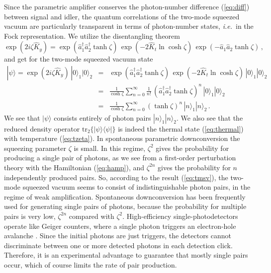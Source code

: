 \documentclass[12pt,amsmath,amssymb]{article}
\numberwithin{equation}{section}
\begin{document}
Since the parametric amplifier conserves the photon-number
difference (\ref{eq:diff}) between signal and idler,
the quantum correlations of the two-mode squeezed vacuum
are particularly transparent in terms of photon-number states,
{\it i.e.}\ in the Fock representation.
We utilize the disentangling theorem \cite{Gilles,Perelomov}
\begin{equation}
\exp(2i\zeta\hat{K}_y) =
\exp(\hat{a}_1^\dagger\hat{a}_2^\dagger\tanh\zeta)\,
\exp(-2\hat{K}_t\ln\cosh\zeta)\,
\exp(-\hat{a}_1\hat{a}_2\tanh\zeta)\,,
\end{equation}
and get for the two-mode squeezed vacuum state
\begin{eqnarray}
|\psi\rangle =
\exp(2i\zeta\hat{K}_y)\, |0\rangle_1 |0\rangle_2
&=&
\exp(\hat{a}_1^\dagger\hat{a}_2^\dagger\tanh\zeta)\,
\exp(-2\hat{K}_t\ln\cosh\zeta)\,
|0\rangle_1 |0\rangle_2
\nonumber\\
&=&
\frac{1}{\cosh\zeta} \sum_{n=0}^\infty \frac{1}{n!}\,
(\hat{a}_1^\dagger\hat{a}_2^\dagger\tanh\zeta)^n\,
|0\rangle_1 |0\rangle_2
\nonumber\\
&=&
\frac{1}{\cosh\zeta} \sum_{n=0}^\infty
(\tanh\zeta)^n\,
|n\rangle_1 |n\rangle_2 \,.
\label{eq:tmsv}
\end{eqnarray}
We see that $|\psi\rangle$ consists entirely of photon pairs
$|n\rangle_1 |n\rangle_2$.
We also see that the reduced density operator
$\mathrm{tr}_2\{|\psi\rangle\langle\psi|\}$ is indeed
the thermal state (\ref{eq:thermal}) with temperature
(\ref{eq:tzeta}).
In spontaneous parametric downconversion \cite{MandelWolf}
the squeezing parameter $\zeta$ is small.
In this regime, $\zeta^2$ gives the probability for producing
a single pair of photons,
as we see from a first-order perturbation theory with
the Hamiltonian (\ref{eq:hamp}),
and $\zeta^{2n}$ gives the probability for $n$
independently produced pairs.
So, according to the result  (\ref{eq:tmsv}), the two-mode
squeezed vacuum seems to consist of
indistinguishable photon pairs,
in the regime of weak amplification.
Spontaneous downconversion \cite{MandelWolf} has been
frequently used for generating single pairs of photons,
because the probability for multiple pairs is very low,  $\zeta^{2n}$
compared with  $\zeta^2$.
High-efficiency single-photodetectors operate like Geiger counters,
where a single photon triggers an electron-hole avalanche
\cite{Leonhardt}. Since the initial photons are just triggers,
the detectors
cannot discriminate between one or more detected photons
in each detection click.
Therefore, it is an experimental advantage to guarantee that
mostly single pairs occur, which of course limits the rate of pair
production.
\end{document}

